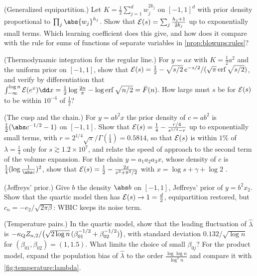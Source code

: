 \begin{refsection}
\begin{exercises}
\item \byhand (Generalized equipartition.) Let $K=\frac12\sum_{j=1}^dw_j^{2k_j}$ on $[-1,1]^d$ with prior density proportional to $\prod_j\abs{w_j}^{h_j}$. Show that $\mathcal{E}(s)=\sum_j\frac{h_j+1}{2k_j}$ up to exponentially small terms. Which learning coefficient does this give, and how does it compare with the rule for sums of functions of separate variables in \cref{prop:blowups:rules}?\label{ex:temperature:equipartition}

\item \byhand (Thermodynamic integration for the regular line.) For $y=ax$ with $K=\frac12a^2$ and the uniform prior on $[-1,1]$, show that $\mathcal{E}(s)=\frac12-\sqrt{s/2}\,e^{-s/2}/(\sqrt\pi\operatorname{erf}\sqrt{s/2})$, and verify by differentiation that $\int_{-\infty}^{\log n}\temperatureE(e^x)\dd x=\frac12\log\frac{2n}\pi-\log\operatorname{erf}\sqrt{n/2}=\bar F(n)$. How large must $s$ be for $\mathcal{E}(s)$ to be within $10^{-4}$ of $\frac12$?

\item \byhand (The cusp and the chain.) For $y=ab^2x$ the prior density of $c=ab^2$ is $\frac12(\abs c^{-1/2}-1)$ on $[-1,1]$. Show that $\mathcal{E}(s)=\frac14-\frac{r/4}{s^{1/4}-r}$ up to exponentially small terms, with $r=2^{1/4}\sqrt\pi/\Gamma(\frac14)=0.5814$, so that $\mathcal{E}(s)$ is within $1\%$ of $\lambda=\frac14$ only for $s\gtrsim1.2\times10^7$, and relate the speed of approach to the second term of the volume expansion. For the chain $y=a_1a_2a_3x$, whose density of $c$ is $\frac14(\log\frac1{\abs c})^2$, show that $\mathcal{E}(s)=\frac12-\frac{2x}{x^2+\pi^2/2}$ with $x=\log s+\gamma+\log2$ .

\item \variation (Jeffreys' prior.) Give $b$ the density $\abs b$ on $[-1,1]$, Jeffreys' prior of $y=b^2x_2$. Show that the quartic model then has $\mathcal{E}(s)\to1=\frac d2$, equipartition restored, but $c_n=-e_2/\sqrt{2\pi\beta}$: WBIC keeps its noise term.

\item \variation (Temperature pairs.) In the quartic model, show that the leading fluctuation of $\hat\lambda$ is $-\kappa_{\mathrm{Q}} Z_{n,2}/\bigl(\sqrt{2\log n}\,(\beta_{01}^{-1/2}+\beta_{02}^{-1/2})\bigr)$, with standard deviation $0.132/\sqrt{\log n}$ for $(\beta_{01},\beta_{02})=(1,1.5)$. What limits the choice of small $\beta_{0j}$? For the product model, expand the population bias of $\hat\lambda$ to the order $\frac{\log\log n}{\log^2n}$ and compare it with \cref{fig:temperature:lambda}.\label{ex:temperature:pairs}


\end{exercises}
\end{refsection}
